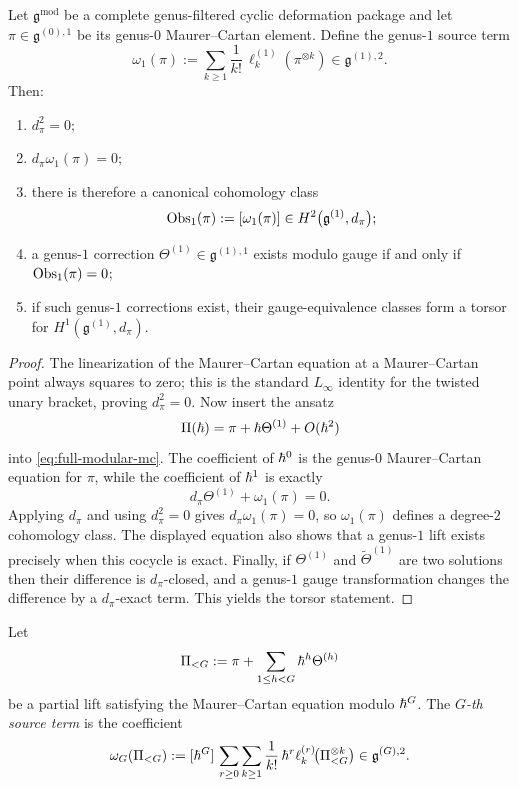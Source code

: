 \begin{theorem}
\label{thm:first-modular-obstruction}
Let $\mathfrak g^{\mathrm{mod}}$ be a complete genus-filtered cyclic deformation package and let
$\pi\in \mathfrak g^{(0),1}$ be its genus-$0$ Maurer--Cartan element. Define the genus-$1$
source term
\begin{equation}
\label{eq:omega-one}
\omega_1(\pi):=\sum_{k\ge 1}\frac1{k!}\,\ell_k^{(1)}(\pi^{\otimes k})
\in \mathfrak g^{(1),2}.
\end{equation}
Then:
\begin{enumerate}[label=\textup{(\alph*)}]
\item $d_\pi^2=0$;
\item $d_\pi\omega_1(\pi)=0$;
\item there is therefore a canonical cohomology class
\[
\operatorname{Obs}_1(\pi):=[\omega_1(\pi)]
\in H^2\bigl(\mathfrak g^{(1)},d_\pi\bigr);
\]
\item a genus-$1$ correction $\Theta^{(1)}\in\mathfrak g^{(1),1}$ exists modulo gauge if and
only if $\operatorname{Obs}_1(\pi)=0$;
\item if such genus-$1$ corrections exist, their gauge-equivalence classes form a torsor for
$H^1(\mathfrak g^{(1)},d_\pi)$.
\end{enumerate}
\end{theorem}

\begin{proof}
The linearization of the Maurer--Cartan equation at a Maurer--Cartan point always squares to
zero; this is the standard $L_\infty$ identity for the twisted unary bracket, proving $d_\pi^2=0$.
Now insert the ansatz
\[
\Pi(\hbar)=\pi+\hbar\Theta^{(1)}+O(\hbar^2)
\]
into \eqref{eq:full-modular-mc}. The coefficient of $\hbar^0$ is the genus-$0$ Maurer--Cartan
equation for $\pi$, while the coefficient of $\hbar^1$ is exactly
\[
d_\pi\Theta^{(1)}+\omega_1(\pi)=0.
\]
Applying $d_\pi$ and using $d_\pi^2=0$ gives $d_\pi\omega_1(\pi)=0$, so
$\omega_1(\pi)$ defines a degree-$2$ cohomology class. The displayed equation also shows that
a genus-$1$ lift exists precisely when this cocycle is exact. Finally, if
$\Theta^{(1)}$ and $\widetilde\Theta^{(1)}$ are two solutions then their difference is
$d_\pi$-closed, and a genus-$1$ gauge transformation changes the difference by a
$d_\pi$-exact term. This yields the torsor statement.
\end{proof}

\begin{definition}
\label{def:higher-source-terms}
Let
\[
\Pi_{<G}:=\pi+\sum_{1\le h<G}\hbar^h\Theta^{(h)}
\]
be a partial lift satisfying the Maurer--Cartan equation modulo $\hbar^G$. The
\emph{$G$-th source term} is the coefficient
\begin{equation}
\label{eq:higher-source-term}
\omega_G(\Pi_{<G})
:=
[\hbar^G]\,
\sum_{r\ge 0}\sum_{k\ge 1}\frac1{k!}\,
\hbar^r\ell_k^{(r)}\!\bigl(\Pi_{<G}^{\otimes k}\bigr)
\in \mathfrak g^{(G),2}.
\end{equation}
\end{definition}

